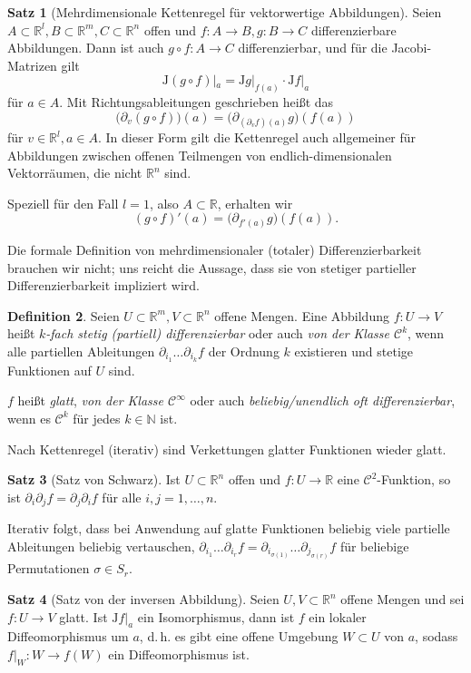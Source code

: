 \documentclass[a4paper]{scrbook}
\numberwithin{equation}{chapter}
\newcommand{\R}{\mathbb{R}}
\newcommand{\sC}{\mathcal{C}^{\infty}}
\theoremstyle{definition}
\newtheorem{defn}{Definition}[section]
\newtheorem{satz}[defn]{Satz}
\begin{document}
\begin{satz}[Mehrdimensionale Kettenregel für vektorwertige Abbildungen]
	Seien $A \subset \R^l, B \subset \R^m, C \subset \R^n$ offen und $f\colon A\to B, g\colon B \to C$ differenzierbare Abbildungen. Dann ist auch $g\circ f\colon A \to C$ differenzierbar, und für die Jacobi-Matrizen gilt
	\[\mathrm{J}(g\circ f)|_a = \mathrm{J}g|_{f(a)} \cdot \mathrm{J}f|_a\]
	für $a \in A$. Mit Richtungsableitungen geschrieben heißt das
	\[\Big(\partial_v(g\circ f)\Big)(a) = \Big(\partial_{(\partial_v f)(a)} g\Big)(f(a))\]
	für $v \in \R^l, a\in A$. In dieser Form gilt die Kettenregel auch allgemeiner für Abbildungen zwischen offenen Teilmengen von endlich-dimensionalen Vektorräumen, die nicht $\R^n$ sind.

	Speziell für den Fall $l=1$, also $A\subset\R$, erhalten wir
	\[(g\circ f)'(a) = \Big(\partial_{f'(a)} g\Big)(f(a)).\]
\end{satz}
Die formale Definition von mehrdimensionaler (totaler) Differenzierbarkeit brauchen wir nicht; uns reicht die Aussage, dass sie von stetiger partieller Differenzierbarkeit impliziert wird.

\begin{defn}
	Seien $U \subset \mathbb R^m, V \subset \mathbb R^n$ offene Mengen. Eine Abbildung $f\colon U\to V$ heißt \emph{$k$-fach stetig (partiell) differenzierbar} oder auch \emph{von der Klasse $\mathcal C^k$}, wenn alle partiellen Ableitungen $\partial_{i_1} \dots \partial_{i_k} f$ der Ordnung $k$ existieren und stetige Funktionen auf $U$ sind.

	$f$ heißt \emph{glatt}, \emph{von der Klasse $\sC$} oder auch \emph{beliebig/unendlich oft differenzierbar}, wenn es $\mathcal C^k$ für jedes $k\in\mathbb N$ ist.

	Nach Kettenregel (iterativ) sind Verkettungen glatter Funktionen wieder glatt.
\end{defn}

\begin{satz}[Satz von Schwarz]
	Ist $U \subset \R^n$ offen und $f\colon U \to \R$ eine $\mathcal C^2$-Funktion, so ist $\partial_i\partial_j f = \partial_j\partial_i f$ für alle $i,j = 1, \dots, n$.
\end{satz}
Iterativ folgt, dass bei Anwendung auf glatte Funktionen beliebig viele partielle Ableitungen beliebig vertauschen, $\partial_{i_1} \dots \partial_{i_r}f = \partial_{i_{\sigma(1)}} \dots \partial_{j_{\sigma(r)}}f$ für beliebige Permutationen $\sigma \in S_r$.

\begin{satz}[Satz von der inversen Abbildung] \label{satz:inv_abb_R^n}
	Seien $U, V \subset \mathbb R^n$ offene Mengen und sei $f\colon U \to V$ glatt. Ist $\left.\mathrm{J}f\right|_a$ ein Isomorphismus, dann ist $f$ ein lokaler Diffeomorphismus um $a$, d.\,h. es gibt eine offene Umgebung $W\subset U$ von $a$, sodass $f|_W \colon W \to f(W)$ ein Diffeomorphismus ist.
\end{satz}
\end{document}
